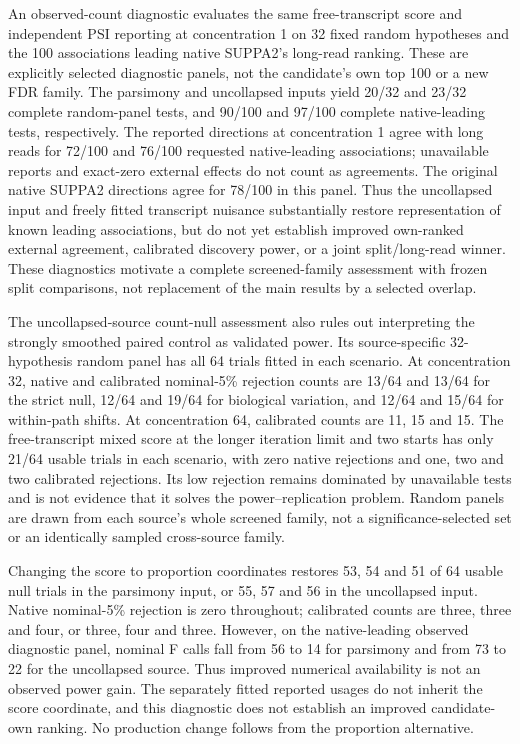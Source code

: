 \documentclass[11pt]{article}
\begin{document}
An observed-count diagnostic evaluates the same free-transcript score and independent PSI reporting at concentration 1 on 32 fixed random hypotheses and the 100 associations leading native SUPPA2's long-read ranking. These are explicitly selected diagnostic panels, not the candidate's own top 100 or a new FDR family. The parsimony and uncollapsed inputs yield 20/32 and 23/32 complete random-panel tests, and 90/100 and 97/100 complete native-leading tests, respectively. The reported directions at concentration 1 agree with long reads for 72/100 and 76/100 requested native-leading associations; unavailable reports and exact-zero external effects do not count as agreements. The original native SUPPA2 directions agree for 78/100 in this panel. Thus the uncollapsed input and freely fitted transcript nuisance substantially restore representation of known leading associations, but do not yet establish improved own-ranked external agreement, calibrated discovery power, or a joint split/long-read winner. These diagnostics motivate a complete screened-family assessment with frozen split comparisons, not replacement of the main results by a selected overlap.

The uncollapsed-source count-null assessment also rules out interpreting the strongly smoothed paired control as validated power. Its source-specific 32-hypothesis random panel has all 64 trials fitted in each scenario. At concentration 32, native and calibrated nominal-5\% rejection counts are 13/64 and 13/64 for the strict null, 12/64 and 19/64 for biological variation, and 12/64 and 15/64 for within-path shifts. At concentration 64, calibrated counts are 11, 15 and 15. The free-transcript mixed score at the longer iteration limit and two starts has only 21/64 usable trials in each scenario, with zero native rejections and one, two and two calibrated rejections. Its low rejection remains dominated by unavailable tests and is not evidence that it solves the power--replication problem. Random panels are drawn from each source's whole screened family, not a significance-selected set or an identically sampled cross-source family.

Changing the score to proportion coordinates restores 53, 54 and 51 of 64 usable null trials in the parsimony input, or 55, 57 and 56 in the uncollapsed input. Native nominal-5\% rejection is zero throughout; calibrated counts are three, three and four, or three, four and three. However, on the native-leading observed diagnostic panel, nominal F calls fall from 56 to 14 for parsimony and from 73 to 22 for the uncollapsed source. Thus improved numerical availability is not an observed power gain. The separately fitted reported usages do not inherit the score coordinate, and this diagnostic does not establish an improved candidate-own ranking. No production change follows from the proportion alternative.
\end{document}
